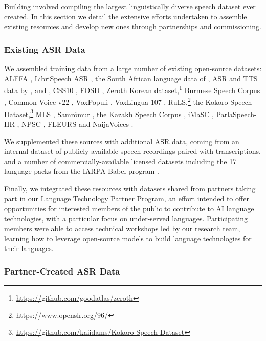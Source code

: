 \documentclass[]{fairmeta}
\begin{document}
Building \OmniASR involved compiling the largest linguistically diverse speech dataset ever created. In this section we detail the extensive efforts undertaken to assemble existing resources and develop new ones through partnerships and commissioning.

\subsubsection{Existing ASR Data}
\label{sec:existing_asr_sources}

We assembled training data from a large number of existing open-source datasets: ALFFA \citep{abate2005alffa,gelas2012alffa,gauthier2016alffa}, LibriSpeech ASR \citep{panayotov2015librispeech}, the South African language data of \citet{vanniekerk2017rapid}, ASR and TTS data by \citet{kjartansson2018crowd}, \citet{kjartansson2018tts} and \citet{he2020open}, CSS10 \citep{park2019css10}, FOSD \citep{fosd}, Zeroth Korean dataset,\footnote{\url{https://github.com/goodatlas/zeroth}} Burmese Speech Corpus \citep{oo2020burmese}, Common Voice v22 \citep{ardila2020common}, VoxPopuli \citep{wang2021voxpopuli}, VoxLingua-107 \citep{valk2021slt}, RuLS,\footnote{\url{https://www.openslr.org/96/}} the Kokoro Speech Dataset,\footnote{\url{https://github.com/kaiidams/Kokoro-Speech-Dataset}} MLS \citep{pratap2020mls}, {S}amr{\'o}mur \citep{mollberg2020samromur}, the Kazakh Speech Corpus \citep{khassanov2021crowdsourced}, iMaSC \citep{gopinath2022imascic}, ParlaSpeech-HR \citep{ljubesic2022parlaspeech}, NPSC \citep{solberg2022norwegian}, FLEURS \citep{conneau2023fleurs} and NaijaVoices \citep{emezue2025naijavoices}.

We supplemented these sources with additional ASR data, coming from an internal dataset of publicly available speech recordings paired with transcriptions, and a number of commercially-available licensed datasets including the 17 language packs from the IARPA Babel program \citep{gales2014babel}.

Finally, we integrated these resources with datasets shared from partners taking part in our Language Technology Partner Program, an effort intended to offer opportunities for interested members of the public to contribute to AI language technologies, with a particular focus on under-served languages. Participating members were able to access technical workshops led by our research team, learning how to leverage open-source models to build language technologies for their languages.

\subsubsection{Partner-Created ASR Data}
\end{document}
